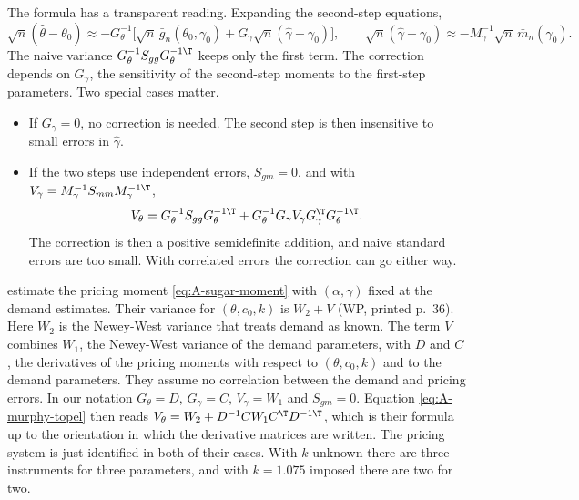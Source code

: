 The formula has a transparent reading. Expanding the second-step equations,
\begin{equation*}
  \sqrt{n}(\hat\theta - \theta_0) \approx -G_\theta^{-1}\Big[\sqrt{n}\,\bar g_n(\theta_0, \gamma_0)
  + G_\gamma\sqrt{n}(\hat\gamma - \gamma_0)\Big],
  \qquad
  \sqrt{n}(\hat\gamma - \gamma_0) \approx -M_\gamma^{-1}\sqrt{n}\,\bar m_n(\gamma_0).
\end{equation*}
The naive variance $G_\theta^{-1}S_{gg}G_\theta^{-1\T}$ keeps only the first term. The correction depends on $G_\gamma$,
the sensitivity of the second-step moments to the first-step parameters. Two special cases matter.
\begin{itemize}
  \item If $G_\gamma = 0$, no correction is needed. The second step is then insensitive to small errors in $\hat\gamma$.
  \item If the two steps use independent errors, $S_{gm} = 0$, and with $V_\gamma = M_\gamma^{-1}S_{mm}M_\gamma^{-1\T}$,
  \begin{equation}\label{eq:A-murphy-topel}
    V_\theta = G_\theta^{-1}S_{gg}G_\theta^{-1\T} + G_\theta^{-1}G_\gamma V_\gamma G_\gamma^\T G_\theta^{-1\T}.
  \end{equation}
  The correction is then a positive semidefinite addition, and naive standard errors are too small. With correlated
  errors the correction can go either way.
\end{itemize}

\citet{GenesoveMullin1998} estimate the pricing moment \eqref{eq:A-sugar-moment} with $(\alpha, \gamma)$ fixed at the demand
estimates. Their variance for $(\theta, c_0, k)$ is $W_2 + V$ (WP, printed p.~36). Here $W_2$ is the Newey-West variance
that treats demand as known. The term $V$ combines $W_1$, the Newey-West variance of the demand parameters, with $D$ and
$C$, the derivatives of the pricing moments with respect to $(\theta, c_0, k)$ and to the demand parameters. They assume no
correlation between the demand and pricing errors. In our notation $G_\theta = D$, $G_\gamma = C$, $V_\gamma = W_1$ and
$S_{gm} = 0$. Equation \eqref{eq:A-murphy-topel} then reads $V_\theta = W_2 + D^{-1}CW_1C^\T D^{-1\T}$, which is their
formula up to the orientation in which the derivative matrices are written. The pricing system is just identified in both
of their cases. With $k$ unknown there are three instruments for three parameters, and with $k = 1.075$ imposed there are
two for two.

